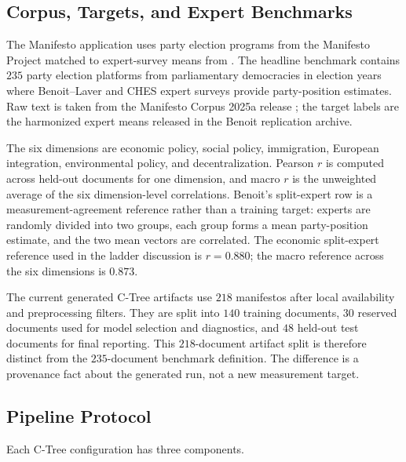 \subsection{Corpus, Targets, and Expert Benchmarks}

The Manifesto application uses party election programs from the Manifesto
Project matched to expert-survey means from \citet{BenoitEtAl2025}. The
headline benchmark contains \(235\) party election platforms from parliamentary
democracies in election years where Benoit--Laver and CHES expert surveys
provide party-position estimates. Raw text is taken from the Manifesto Corpus
2025a release \citep{ManifestoProject2025a,ManifestoCorpus2025}; the target
labels are the harmonized expert means released in the Benoit replication
archive.

The six dimensions are economic policy, social policy, immigration, European
integration, environmental policy, and decentralization. Pearson \(r\) is
computed across held-out documents for one dimension, and macro \(r\) is the
unweighted average of the six dimension-level correlations. Benoit's
split-expert row is a measurement-agreement reference rather than a training
target: experts are randomly divided into two groups, each group forms a mean
party-position estimate, and the two mean vectors are correlated. The economic
split-expert reference used in the ladder discussion is \(r=0.880\); the macro
reference across the six dimensions is \(0.873\).

The current generated C-Tree artifacts use \(218\) manifestos after local
availability and preprocessing filters. They are split into \(140\) training
documents, \(30\) reserved documents used for model selection and diagnostics,
and \(48\) held-out test documents for final reporting. This \(218\)-document
artifact split is therefore distinct from the \(235\)-document benchmark
definition. The difference is a provenance fact about the generated run, not a
new measurement target.

\subsection{Pipeline Protocol}

Each C-Tree configuration has three components.

